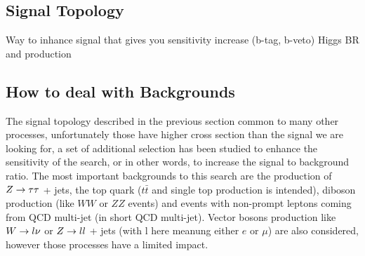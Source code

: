 \subsection{Signal Topology}
Way to inhance signal that gives you sensitivity increase (b-tag, b-veto)
Higgs BR and production

\subsection{How to deal with Backgrounds}

The signal topology described in the previous section common to many other processes, unfortunately 
those have higher cross section than the signal we are looking for,
a set of additional selection has been studied to enhance the sensitivity of the search, or in other words,
to increase the signal  to background  ratio. The most important backgrounds to this search are the production of
 $Z\rightarrow \tau\tau $ + jets, the top quark ($t\bar{t}$ and single top production is intended), diboson production 
(like $WW$ or $ZZ$ events) and events with non-prompt leptons coming from QCD multi-jet (in short QCD multi-jet).
Vector bosons production like  $W\rightarrow l\nu$ or $Z\rightarrow ll$ + jets (with l here meanung either $e$ or $\mu$) are also considered,
however those processes have a limited impact.

